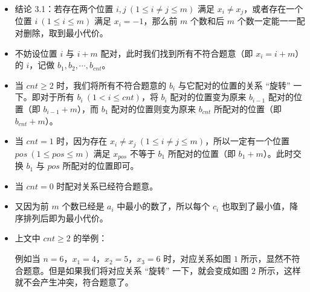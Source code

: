 \documentclass[10pt,aspectratio=43,mathserif]{beamer}
\begin{document}
\begin{frame}

	\begin{itemize} \setlength{\parskip}{0.4\baselineskip}

		\item 结论 3.1：若存在两个位置 $i,j\ (1\leq i\neq j\leq m)$ 满足 $x_i\neq x_j$，或者存在一个位置 $i\ (1\leq i\leq m)$ 满足 $x_i=-1$，那么前 $m$ 个数和后 $m$ 个数一定能一一配对删除，取到最小代价。

		\item 不妨设位置 $i$ 与 $i+m$ 配对，此时我们找到所有不符合题意（即 $x_i=i+m$）的 $i$，记做 $b_1,b_2,\cdots,b_{cnt}$。

		\item 当 $cnt\ge 2$ 时，我们将所有不符合题意的 $b_i$ 与它配对的位置的关系 “旋转” 一下。即对于所有 $b_i\ (1<i\leq cnt)$，将 $b_i$ 配对的位置变为原来 $b_{i-1}$ 配对的位置（即 $b_{i-1}+m$），而 $b_1$ 配对的位置则变为原来 $b_{cnt}$ 所配对的位置（即 $b_{cnt}+m$）。

		\item 当 $cnt=1$ 时，因为存在 $x_i\neq x_j\ (1\leq i\neq j\leq m)$，所以一定有一个位置 $pos\ (1\leq pos\leq m)$ 满足 $x_{pos}$ 不等于 $b_1$ 所配对的位置（即 $b_1+m$）。此时交换 $b_1$ 与 $pos$ 所配对的位置即可。

		\item 当 $cnt=0$ 时配对关系已经符合题意。

		\item 又因为前 $m$ 个数已经是 $a_i$ 中最小的数了，所以每个 $c_i$ 也取到了最小值，降序排列后即为最小代价。

	\end{itemize}

\end{frame}

\begin{frame}

	\begin{itemize} \setlength{\parskip}{0.4\baselineskip}

		\item 上文中 $cnt\ge 2$ 的举例：

		例如当 $n=6$，$x_1=4$，$x_2=5$，$x_3=6$ 时，对应关系如图 $1$ 所示，显然不符合题意。但是如果我们将对应关系 “旋转” 一下，就会变成如图 $2$ 所示，这样就不会产生冲突，符合题意了。

		\begin{figure}[H]
			\centering
		\end{figure}

	\end{itemize}

\end{frame}
\end{document}
